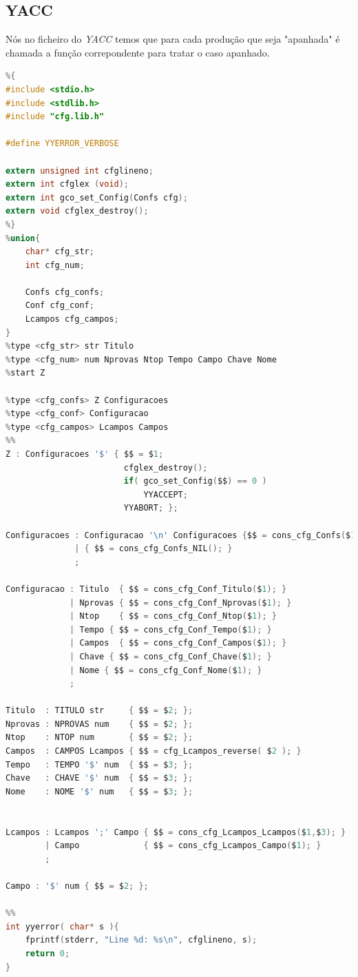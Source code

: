 \documentclass[11pt, a4paper, oneside]{article}
\begin{document}
\newpage
\subsection{YACC}

Nós no ficheiro do \textit{YACC} temos que para cada produção que seja "apanhada" é chamada a função correpondente para  tratar o caso apanhado.

\begin{lstlisting}[language=C, caption={YACC do ficheiro de Configuração}]
%token TITULO NPROVAS NTOP CAMPOS TEMPO CHAVE NOME str num
%{
#include <stdio.h>
#include <stdlib.h>
#include "cfg.lib.h"

#define YYERROR_VERBOSE

extern unsigned int cfglineno;
extern int cfglex (void);
extern int gco_set_Config(Confs cfg);
extern void cfglex_destroy();
%}
%union{
    char* cfg_str;
    int cfg_num;
    
    Confs cfg_confs;
    Conf cfg_conf;
    Lcampos cfg_campos;
}
%type <cfg_str> str Titulo
%type <cfg_num> num Nprovas Ntop Tempo Campo Chave Nome
%start Z

%type <cfg_confs> Z Configuracoes
%type <cfg_conf> Configuracao
%type <cfg_campos> Lcampos Campos
%%
Z : Configuracoes '$' { $$ = $1;
                        cfglex_destroy();
                        if( gco_set_Config($$) == 0 )
                            YYACCEPT;
                        YYABORT; };

Configuracoes : Configuracao '\n' Configuracoes {$$ = cons_cfg_Confs($1,$3);}
              | { $$ = cons_cfg_Confs_NIL(); }
              ;

Configuracao : Titulo  { $$ = cons_cfg_Conf_Titulo($1); }
             | Nprovas { $$ = cons_cfg_Conf_Nprovas($1); }
             | Ntop    { $$ = cons_cfg_Conf_Ntop($1); }
             | Tempo { $$ = cons_cfg_Conf_Tempo($1); }
             | Campos  { $$ = cons_cfg_Conf_Campos($1); }
             | Chave { $$ = cons_cfg_Conf_Chave($1); }
             | Nome { $$ = cons_cfg_Conf_Nome($1); }
             ;

Titulo  : TITULO str     { $$ = $2; };
Nprovas : NPROVAS num    { $$ = $2; };
Ntop    : NTOP num       { $$ = $2; };
Campos  : CAMPOS Lcampos { $$ = cfg_Lcampos_reverse( $2 ); }
Tempo   : TEMPO '$' num  { $$ = $3; };
Chave   : CHAVE '$' num  { $$ = $3; };
Nome    : NOME '$' num   { $$ = $3; };


Lcampos : Lcampos ';' Campo { $$ = cons_cfg_Lcampos_Lcampos($1,$3); }
        | Campo             { $$ = cons_cfg_Lcampos_Campo($1); }
        ;

Campo : '$' num { $$ = $2; };

%%
int yyerror( char* s ){
    fprintf(stderr, "Line %d: %s\n", cfglineno, s);
    return 0;
}
\end{lstlisting} 
\end{document}
